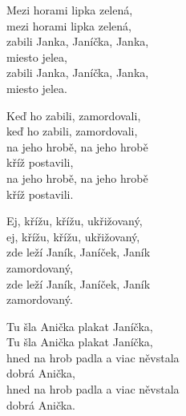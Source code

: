 
\ve{}
Mezi horami lipka zelená,\\
mezi horami lipka zelená,\\
zabili Janka, Janíčka, Janka,\\
miesto jelea,\\
zabili Janka, Janíčka, Janka,\\
miesto jelea. 

\ve{}
Keď ho zabili, zamordovali,\\
keď ho zabili, zamordovali,\\
na jeho hrobě, na jeho hrobě\\
kříž postavili,\\
na jeho hrobě, na jeho hrobě\\
kříž postavili.

\ve{}
Ej, křížu, křížu, ukřižovaný,\\
ej, křížu, křížu, ukřižovaný,\\
zde leží Janík, Janíček, Janík\\
zamordovaný,\\
zde leží Janík, Janíček, Janík\\
zamordovaný.

\ve{}
Tu šla Anička plakat Janíčka,\\
Tu šla Anička plakat Janíčka,\\
hned na hrob padla a viac něvstala\\
dobrá Anička,\\
hned na hrob padla a viac něvstala\\
dobrá Anička.

\esong